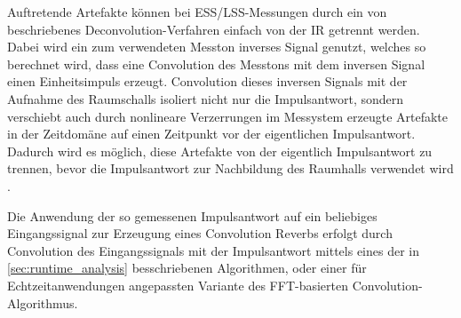 Auftretende Artefakte können bei ESS/LSS-Messungen durch ein von \cite{farina2000} beschriebenes Deconvolution-Verfahren einfach von der IR getrennt werden.
Dabei wird ein zum verwendeten Messton inverses Signal genutzt, welches so berechnet wird, dass eine Convolution des Messtons mit dem inversen Signal einen Einheitsimpuls erzeugt.
Convolution dieses inversen Signals mit der Aufnahme des Raumschalls isoliert nicht nur die Impulsantwort, sondern verschiebt auch durch nonlineare Verzerrungen im Messystem
erzeugte Artefakte in der Zeitdomäne auf einen Zeitpunkt vor der eigentlichen Impulsantwort. Dadurch wird es möglich, diese Artefakte von der eigentlich Impulsantwort
zu trennen, bevor die Impulsantwort zur Nachbildung des Raumhalls verwendet wird \cite{farina2000}. 

Die Anwendung der so gemessenen Impulsantwort auf ein beliebiges Eingangssignal
zur Erzeugung eines Convolution Reverbs erfolgt durch Convolution des Eingangssignals mit der Impulsantwort mittels eines der in \ref{sec:runtime_analysis} besschriebenen
Algorithmen, oder einer für Echtzeitanwendungen angepassten Variante des FFT-basierten Convolution-Algorithmus.



